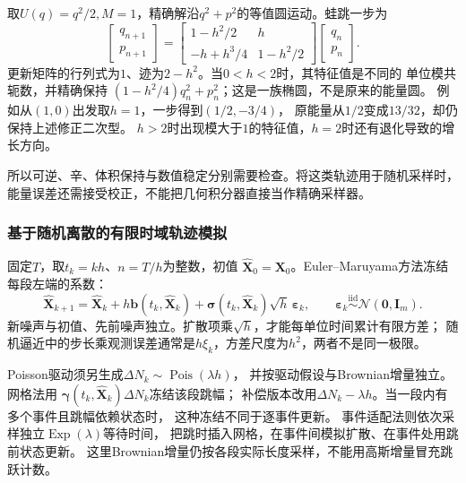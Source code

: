 \begin{example}[谐振子的精确与数值轨道]
  \label{ex:dynamical-harmonic-oscillator}
  取$U(q)=q^2/2,M=1$，精确解沿$q^2+p^2$的等值圆运动。蛙跳一步为
  \[
    \begin{bmatrix}q_{n+1}\\p_{n+1}\end{bmatrix}
    =
    \begin{bmatrix}1-h^2/2&h\\-h+h^3/4&1-h^2/2\end{bmatrix}
    \begin{bmatrix}q_n\\p_n\end{bmatrix}.
  \]
  更新矩阵的行列式为$1$、迹为$2-h^2$。当$0<h<2$时，其特征值是不同的
  单位模共轭数，并精确保持
  $(1-h^2/4)q_n^2+p_n^2$；这是一族椭圆，不是原来的能量圆。
  例如从$(1,0)$出发取$h=1$，一步得到$(1/2,-3/4)$，
  原能量从$1/2$变成$13/32$，却仍保持上述修正二次型。
  $h>2$时出现模大于$1$的特征值，$h=2$时还有退化导致的增长方向。
\end{example}
所以可逆、辛、体积保持与数值稳定分别需要检查。将这类轨迹用于随机采样时，
能量误差还需接受校正，不能把几何积分器直接当作精确采样器。

\subsubsection{基于随机离散的有限时域轨迹模拟}
固定$T$，取$t_k=kh$、$n=T/h$为整数，初值
$\widehat{\bm X}_0=\bm X_0$。Euler--Maruyama方法冻结每段左端的系数：
\begin{equation}
 \widehat{\bm X}_{k+1}=\widehat{\bm X}_k+
    h\bm b(t_k,\widehat{\bm X}_k)
    +\bm\sigma(t_k,\widehat{\bm X}_k)\sqrt h\,\bm\varepsilon_k,
 \qquad \bm\varepsilon_k\overset{\mathrm{iid}}{\sim}\mathcal N(\bm0,\bm I_m).
 \label{eq:dynamical-euler-maruyama}
\end{equation}
新噪声与初值、先前噪声独立。扩散项乘$\sqrt h$，才能每单位时间累计有限方差；
随机逼近中的步长乘观测误差通常是$h\xi_k$，方差尺度为$h^2$，两者不是同一极限。

Poisson驱动须另生成$\Delta N_k\sim\operatorname{Pois}(\lambda h)$，
并按驱动假设与Brownian增量独立。网格法用
$\bm\gamma(t_k,\widehat{\bm X}_k)\Delta N_k$冻结该段跳幅；
补偿版本改用$\Delta N_k-\lambda h$。当一段内有多个事件且跳幅依赖状态时，
这种冻结不同于逐事件更新。
事件适配法则依次采样独立$\operatorname{Exp}(\lambda)$等待时间，
把跳时插入网格，在事件间模拟扩散、在事件处用跳前状态更新。
这里Brownian增量仍按各段实际长度采样，不能用高斯增量冒充跳跃计数。

